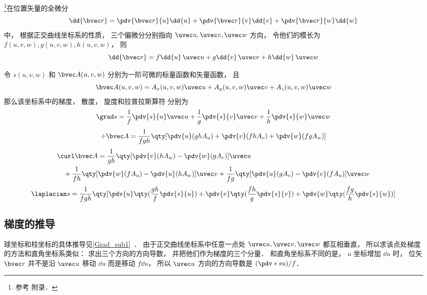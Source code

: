 

\footnote{参考 \cite{GriffE} 附录．}在位置矢量的全微分
\begin{equation}
\dd{\bvec r} = \pdv{\bvec r}{u}\dd{u} + \pdv{\bvec r}{v}\dd{v} + \pdv{\bvec r}{w}\dd{w}
\end{equation}
中， 根据正交曲线坐标系的性质， 三个偏微分分别指向 $\uvec u, \uvec v, \uvec w$ 方向， 令他们的模长为 $f(u,v,w), g(u,v,w), h(u,v,w)$， 则
\begin{equation}\label{CVecOp_eq4}
\dd{\bvec r} = f\dd{u}\,\uvec u + g\dd{v}\,\uvec v + h\dd{w}\,\uvec w
\end{equation}

令 $s(u, v, w)$ 和 $\bvec A(u, v, w)$ 分别为一阶可微的标量函数和矢量函数， 且
\begin{equation}
\bvec A(u, v, w) = A_x(u, v, w)\uvec u + A_y(u, v, w)\uvec v + A_z(u, v, w)\uvec w
\end{equation}
那么该坐标系中的梯度， 散度， 旋度和拉普拉斯算符 分别为
\begin{equation}\label{CVecOp_eq1}
\grad s = \frac{1}{f} \pdv{s}{u}\uvec u + \frac{1}{g}\pdv{s}{v} \uvec v + \frac{1}{h} \pdv{s}{w}\uvec w
\end{equation}
\begin{equation}\label{CVecOp_eq2}
\div \bvec A = \frac{1}{fgh}\qty[\pdv{u}(ghA_u) + \pdv{v}(fhA_v) + \pdv{w}(fgA_w)]
\end{equation}
\begin{equation}\label{CVecOp_eq3}
\begin{aligned}
&\curl \bvec A = \frac{1}{gh}\qty[\pdv{v}(hA_w) - \pdv{w}(gA_v)]\uvec u\\
&\quad + \frac{1}{fh}\qty[\pdv{w}(fA_u) - \pdv{u}(hA_w)]\uvec v
+ \frac{1}{fg}\qty[\pdv{u}(gA_v) - \pdv{v}(fA_u)]\uvec w
\end{aligned}
\end{equation}
\begin{equation}\label{CVecOp_eq6}
\laplacian s = \frac{1}{fgh}\qty[\pdv{u}\qty(\frac{gh}{f}\pdv{s}{u}) + \pdv{v}\qty(\frac{fh}{g}\pdv{s}{v}) + \pdv{w}\qty(\frac{fg}{h}\pdv{s}{w})]
\end{equation}

\subsection{梯度的推导}
球坐标和柱坐标的具体推导见\autoref{Grad_sub1}~． 由于正交曲线坐标系中任意一点处 $\uvec u, \uvec v, \uvec w$ 都互相垂直， 所以求该点处梯度的方法和直角坐标系类似： 求出三个方向的方向导数， 并把他们作为梯度的三个分量． 和直角坐标系不同的是， $u$ 坐标增加 $\dd{u}$ 时， 位矢 $\bvec r$ 并不是沿 $\uvec u$ 移动 $\dd{u}$ 而是移动 $f \dd{u}$， 所以 $\uvec u$ 方向的方向导数是 $(\pdv*{s}{u})/f$．

